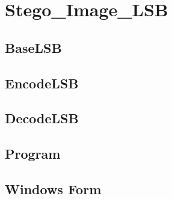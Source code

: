 \chapter{Stego\_Image\_LSB}
\section*{BaseLSB}

\section*{EncodeLSB}

\section*{DecodeLSB}

\section*{Program}

\section*{Windows Form}

